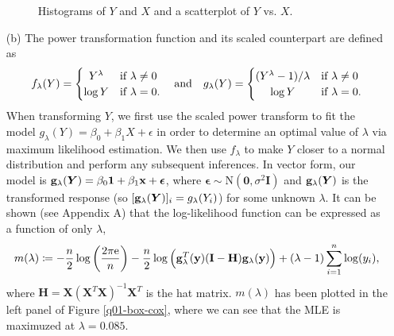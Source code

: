 \documentclass[10pt]{article}
\begin{document}
\begin{itemize}
\begin{figure}[ht]
        \caption{Histograms of \(Y\) and \(X\) and a scatterplot of \(Y\) vs. \(X\).}
        \label{q01-investigation}
    \end{figure}
    \item[(b)] The power transformation function and its scaled counterpart are defined as 
    \begin{align*}
        f_{\lambda}(Y) 
        = \begin{cases}
            \hfil Y^{\lambda} & \text{if } \lambda \neq 0 \\
            \log Y & \text{if } \lambda = 0.
        \end{cases}
        ~~~\text{and}~~~
        g_{\lambda}(Y) 
        = \begin{cases}
            (Y^{\lambda} - 1) / \lambda & \text{if } \lambda \neq 0 \\
            \hfil \log Y & \text{if } \lambda = 0.
        \end{cases}
    \end{align*}
    When transforming \(Y\), we first use the scaled power transform to fit the model \(g_{\lambda}(Y) = \beta_0 + \beta_1 X + \epsilon\) in order
    to determine an optimal value of \(\lambda\) via maximum likelihood estimation. 
    We then use \(f_{\lambda}\) to make \(Y\) closer to a normal distribution and perform any subsequent inferences. 
    In vector form, our model is \(\mathbf{g}_{\lambda}(\bm{Y}) = \beta_0 \mathbf{1} + \beta_1 \mathbf{x} + \bm{\epsilon}\), where \(\bm{\epsilon} \sim \mathrm{N}(\mathbf{0}, \sigma^2 \mathbf{I})\)
    and \(\mathbf{g}_{\lambda}(\bm{Y})\) is the transformed response (so \([\mathbf{g}_{\lambda}(\bm{Y})]_i = g_{\lambda}(Y_i)\)) for some unknown \(\lambda\). 
    It can be shown (see Appendix A) that the log-likelihood function can be expressed as a function of only \(\lambda\), 
    \begin{align*}
        m(\lambda)
        \coloneqq - \frac{n}{2} \log \left( \frac{2 \pi \mathrm{e}}{n} \right) - \frac{n}{2} \log \Big( \mathbf{g}_{\lambda}^T(\mathbf{y})(\mathbf{I} - \mathbf{H}) \mathbf{g}_{\lambda}(\mathbf{y}) \Big) + (\lambda - 1) \sum_{i=1}^n \log(y_i),
    \end{align*}
    where \(\mathbf{H} = \mathbf{X}(\mathbf{X}^T\mathbf{X})^{-1}\mathbf{X}^T\) is the hat matrix. \(m(\lambda)\) has been plotted in the left panel of Figure \ref{q01-box-cox},
    where we can see that the MLE is maximuzed at \(\lambda = 0.085\). 


\end{itemize}
\end{document}
